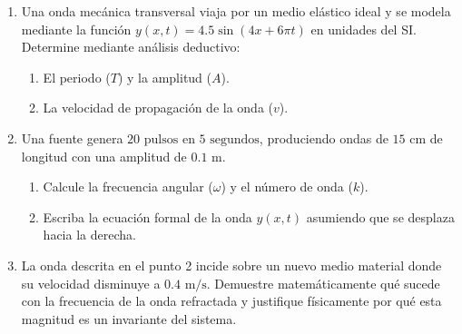 \documentclass[11pt, letterpaper]{article}
\newif\ifmostrarrespuestas
\newcommand{\respuesta}[1]{
	\ifmostrarrespuestas
	\par\vspace{0.2cm}
	\textbf{\textcolor{blue}{Solución:}} \textcolor{blue}{#1}
	\vspace{0.4cm}
	\else
	\fi
}
\begin{document}
	\begin{enumerate}[leftmargin=*, itemsep=0.8cm]
		
		\item  Una onda mecánica transversal viaja por un medio elástico ideal y se modela mediante la función $y(x,t) = 4.5 \sin(4x + 6\pi t)$ en unidades del SI. Determine mediante análisis deductivo:
		\begin{enumerate}[label=\alph*., itemsep=0.2cm]
			\item El periodo ($T$) y la amplitud ($A$).
			\item La velocidad de propagación de la onda ($v$).
		\end{enumerate}
		\respuesta{
			a) De la estructura $y(x,t) = A \sin(kx + \omega t)$, extraemos: $A = 4.5 \text{ m}$. La frecuencia angular es $\omega = 6\pi \text{ rad/s}$. Sabiendo que $T = \frac{2\pi}{\omega}$, tenemos $T = \frac{2\pi}{6\pi} = \frac{1}{3} \text{ s} \approx 0.33 \text{ s}$.\\
			b) El número de onda es $k = 4 \text{ rad/m}$. La velocidad de propagación es $v = \frac{\omega}{k} = \frac{6\pi}{4} = \frac{3\pi}{2} \text{ m/s} \approx 4.71 \text{ m/s}$.
		}
		
		\item  Una fuente genera $20 \text{ pulsos}$ en $5 \text{ segundos}$, produciendo ondas de $15 \text{ cm}$ de longitud con una amplitud de $0.1 \text{ m}$.
		\begin{enumerate}[label=\alph*., itemsep=0.2cm]
			\item Calcule la frecuencia angular ($\omega$) y el número de onda ($k$).
			\item Escriba la ecuación formal de la onda $y(x,t)$ asumiendo que se desplaza hacia la derecha.
		\end{enumerate}
		\respuesta{
			a) Frecuencia $f = \frac{20}{5} = 4 \text{ Hz}$. La frecuencia angular $\omega = 2\pi f = 8\pi \text{ rad/s}$. La longitud de onda es $\lambda = 0.15 \text{ m}$, por lo que el número de onda $k = \frac{2\pi}{\lambda} = \frac{2\pi}{0.15} = \frac{40\pi}{3} \text{ rad/m} \approx 41.89 \text{ rad/m}$.\\
			b) Como se desplaza hacia la derecha, el signo interno es negativo: $y(x,t) = 0.1 \sin\left(\frac{40\pi}{3} x - 8\pi t\right)$.
		}
		
		\item  La onda descrita en el punto 2 incide sobre un nuevo medio material donde su velocidad disminuye a $0.4 \text{ m/s}$. Demuestre matemáticamente qué sucede con la frecuencia de la onda refractada y justifique físicamente por qué esta magnitud es un invariante del sistema.
		\respuesta{
			Físicamente, la frecuencia está determinada exclusivamente por la fuente generadora de la vibración inicial, no por el medio material. Por tanto, la frecuencia en el medio 2 será exactamente igual a la del medio 1: $f_2 = f_1 = 4 \text{ Hz}$. La magnitud es invariante debido a la conservación del número de frentes de onda que cruzan la interfaz por unidad de tiempo.
		}
		

\end{enumerate}
\end{document}
